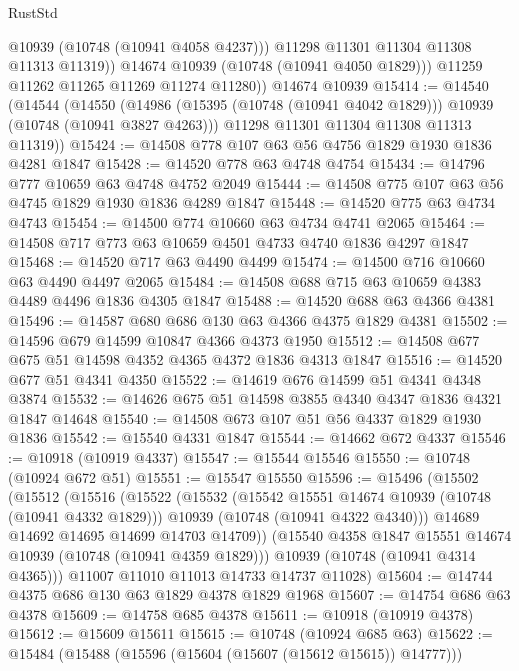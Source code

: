\begin{lexlean}{RustStd}
\begin{coremodule}
{\begin{coremodule}
{{{{{                @10939
                (@10748 (@10941 @4058 @4237)))
              @11298
              @11301
              @11304
              @11308
              @11313
              @11319))
          @14674
          @10939
          (@10748 (@10941 @4050 @1829)))
        @11259
        @11262
        @11265
        @11269
        @11274
        @11280))
    @14674
    @10939
@15414 := @14540
    (@14544
      (@14550
        (@14986 (@15395 (@10748 (@10941 @4042 @1829))) @10939 (@10748 (@10941 @3827 @4263)))
        @11298
        @11301
        @11304
        @11308
        @11313
        @11319))
@15424 := @14508 @778 @107 @63 @56 @4756 @1829 @1930 @1836 @4281 @1847
@15428 := @14520 @778 @63 @4748 @4754
@15434 := @14796 @777 @10659 @63 @4748 @4752 @2049
@15444 := @14508 @775 @107 @63 @56 @4745 @1829 @1930 @1836 @4289 @1847
@15448 := @14520 @775 @63 @4734 @4743
@15454 := @14500 @774 @10660 @63 @4734 @4741 @2065
@15464 := @14508 @717 @773 @63 @10659 @4501 @4733 @4740 @1836 @4297 @1847
@15468 := @14520 @717 @63 @4490 @4499
@15474 := @14500 @716 @10660 @63 @4490 @4497 @2065
@15484 := @14508 @688 @715 @63 @10659 @4383 @4489 @4496 @1836 @4305 @1847
@15488 := @14520 @688 @63 @4366 @4381
@15496 := @14587 @680 @686 @130 @63 @4366 @4375 @1829 @4381
@15502 := @14596 @679 @14599 @10847 @4366 @4373 @1950
@15512 := @14508 @677 @675 @51 @14598 @4352 @4365 @4372 @1836 @4313 @1847
@15516 := @14520 @677 @51 @4341 @4350
@15522 := @14619 @676 @14599 @51 @4341 @4348 @3874
@15532 := @14626 @675 @51 @14598 @3855 @4340 @4347 @1836 @4321 @1847 @14648
@15540 := @14508 @673 @107 @51 @56 @4337 @1829 @1930 @1836
@15542 := @15540 @4331 @1847
@15544 := @14662 @672 @4337
@15546 := @10918 (@10919 @4337)
@15547 := @15544 @15546
@15550 := @10748 (@10924 @672 @51)
@15551 := @15547 @15550
@15596 := @15496
    (@15502
      (@15512
        (@15516
          (@15522
            (@15532
              (@15542 @15551 @14674 @10939 (@10748 (@10941 @4332 @1829)))
              @10939
              (@10748 (@10941 @4322 @4340)))
            @14689
            @14692
            @14695
            @14699
            @14703
            @14709))
        (@15540 @4358 @1847 @15551 @14674 @10939 (@10748 (@10941 @4359 @1829)))
        @10939
        (@10748 (@10941 @4314 @4365)))
      @11007
      @11010
      @11013
      @14733
      @14737
      @11028)
@15604 := @14744 @4375 @686 @130 @63 @1829 @4378 @1829 @1968
@15607 := @14754 @686 @63 @4378
@15609 := @14758 @685 @4378
@15611 := @10918 (@10919 @4378)
@15612 := @15609 @15611
@15615 := @10748 (@10924 @685 @63)
@15622 := @15484 (@15488 (@15596 (@15604 (@15607 (@15612 @15615)) @14777)))
}}}}}
\end{coremodule}}
\end{coremodule}
\end{lexlean}
